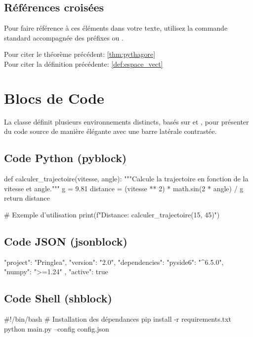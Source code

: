 \documentclass[theme=pringlea]{myrtille}
\begin{document}
\subsection{Références croisées}
Pour faire référence à ces éléments dans votre texte, utilisez la commande standard  accompagnée des préfixes  ou .

Pour citer le théorème précédent: \ref{thm:pythagore}\\
Pour citer la définition précédente: \ref{def:espace_vect}

\section{Blocs de Code}
La classe définit plusieurs environnements distincts, basés sur  et , pour présenter du code source de manière élégante avec une barre latérale contrastée.

\subsection{Code Python (pyblock)}
\begin{pyblock}
def calculer_trajectoire(vitesse, angle):
    """Calcule la trajectoire en fonction de la vitesse et angle."""
    g = 9.81
    distance = (vitesse ** 2) * math.sin(2 * angle) / g
    return distance

# Exemple d'utilisation
print(f"Distance: {calculer_trajectoire(15, 45)}")
\end{pyblock}

\subsection{Code JSON (jsonblock)}
\begin{jsonblock}
{
  "project": "Pringlea",
  "version": "2.0",
  "dependencies": {
    "pyside6": "^6.5.0",
    "numpy": ">=1.24"
  },
  "active": true
}
\end{jsonblock}

\subsection{Code Shell (shblock)}
\begin{shblock}
#!/bin/bash
# Installation des dépendances
pip install -r requirements.txt
python main.py --config config.json
\end{shblock}
\end{document}
